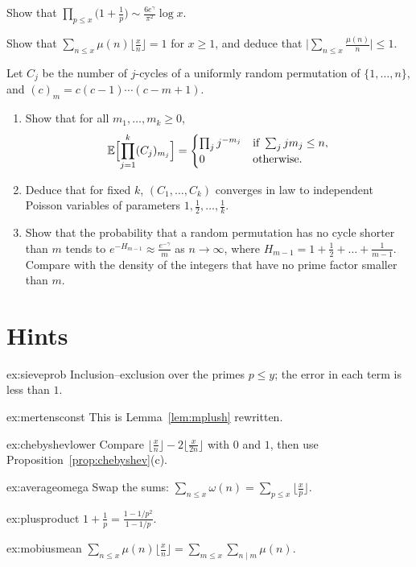 \begin{exercise}[$\star\star$]\label{ex:plusproduct}
Show that $\prod_{p\le x}\bigl(1+\frac1p\bigr)\sim\frac{6e^\gamma}{\pi^2}\log x$.
\end{exercise}

\begin{exercise}[$\star\star$]\label{ex:mobiusmean}
Show that $\sum_{n\le x}\mu(n)\lfloor\frac xn\rfloor=1$ for $x\ge1$, and deduce that $\bigl|\sum_{n\le x}\frac{\mu(n)}n\bigr|\le1$.
\end{exercise}

\begin{exercise}[$\star\star$]\label{pb:poissoncycles}
Let $C_j$ be the number of $j$-cycles of a uniformly random permutation of $\{1,\dots,n\}$, and $(c)_m=c(c-1)\cdots(c-m+1)$.
\begin{enumerate}[label=(\alph*)]
\item Show that for all $m_1,\dots,m_k\ge0$,
\[
\mathbb E\Bigl[\prod_{j=1}^k(C_j)_{m_j}\Bigr]=\begin{cases}\prod_jj^{-m_j}&\text{if }\sum_jjm_j\le n,\\0&\text{otherwise.}\end{cases}
\]
\item Deduce that for fixed $k$, $(C_1,\dots,C_k)$ converges in law to independent Poisson variables of parameters
$1,\frac12,\dots,\frac1k$.
\item Show that the probability that a random permutation has no cycle shorter than $m$ tends to
$e^{-H_{m-1}}\approx\frac{e^{-\gamma}}m$ as $n\to\infty$, where $H_{m-1}=1+\frac12+\dots+\frac1{m-1}$. Compare with the
density of the integers that have no prime factor smaller than $m$.
\end{enumerate}
\end{exercise}

\section{Hints}

\begin{hint}{ex:sieveprob}
Inclusion--exclusion over the primes $p\le y$; the error in each term is less than $1$.
\end{hint}
\begin{hint}{ex:mertensconst}
This is Lemma~\ref{lem:mplush} rewritten.
\end{hint}
\begin{hint}{ex:chebyshevlower}
Compare $\lfloor\frac xn\rfloor-2\lfloor\frac x{2n}\rfloor$ with $0$ and $1$, then use Proposition~\ref{prop:chebyshev}(c).
\end{hint}
\begin{hint}{ex:averageomega}
Swap the sums: $\sum_{n\le x}\omega(n)=\sum_{p\le x}\lfloor\frac xp\rfloor$.
\end{hint}
\begin{hint}{ex:plusproduct}
$1+\frac1p=\frac{1-1/p^2}{1-1/p}$.
\end{hint}
\begin{hint}{ex:mobiusmean}
$\sum_{n\le x}\mu(n)\lfloor\frac xn\rfloor=\sum_{m\le x}\sum_{n\mid m}\mu(n)$.
\end{hint}

